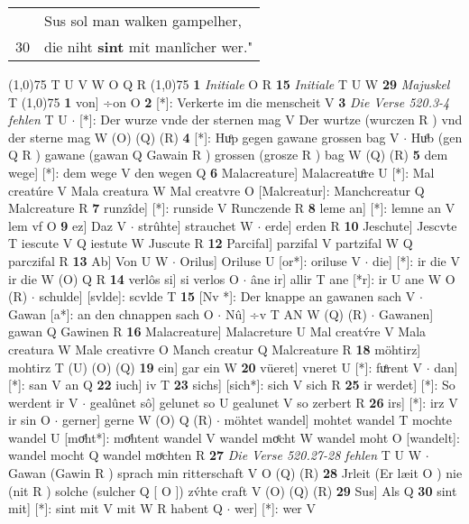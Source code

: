 \documentclass[8pt,a4paper,notitlepage]{article}
\begin{document}
\begin{table}[ht]
\begin{minipage}[t]{0.5\linewidth}
\begin{tabular}{rl}
 & Sus sol man walken gampelher,\\ 
30 & die niht \textbf{sint} mit manlîcher wer."\\ 
\end{tabular}
\scriptsize
\line(1,0){75} \newline
T U V W O Q R \newline
\line(1,0){75} \newline
\textbf{1} \textit{Initiale} O R  \textbf{15} \textit{Initiale} T U W  \textbf{29} \textit{Majuskel} T  \newline
\line(1,0){75} \newline
\textbf{1} von] ÷on O \textbf{2} [*]: Verkerte im die menscheit V \textbf{3} \textit{Die Verse 520.3-4 fehlen} T U   $\cdot$ [*]: Der wurze vnde der sternen mag V Der wurtze (wurczen R ) vnd der sterne mag W (O) (Q) (R) \textbf{4} [*]: Huͦp gegen gawane grossen bag V  $\cdot$ Huͦb (gen Q R ) gawane (gawan Q Gawain R ) grossen (grosze R ) bag W (Q) (R) \textbf{5} dem wege] [*]: dem wege V den wegen Q \textbf{6} Malacreature] Malacreatuͦre U [*]: Mal creatúre V Mala creatura W Mal creatvre O [Malcreatur]: Manchcreatur Q Malcreature R \textbf{7} runzîde] [*]: runside V Runczende R \textbf{8} leme an] [*]: lemne an V lem vf O \textbf{9} ez] Daz V  $\cdot$ strûhte] strauchet W  $\cdot$ erde] erden R \textbf{10} Jeschute] Jescvte T iescute V Q iestute W Juscute R \textbf{12} Parcifal] parzifal V partzifal W Q parczifal R \textbf{13} Ab] Von U W  $\cdot$ Orilus] Oriluse U [or*]: oriluse V  $\cdot$ die] [*]: ir die V ir die W (O) Q R \textbf{14} verlôs si] si verlos O  $\cdot$ âne ir] allir T ane [*r]: ir U ane W O (R)  $\cdot$ schulde] [svlde]: scvlde T \textbf{15} [Nv *]: Der knappe an gawanen sach V  $\cdot$ Gawan [a*]: an den chnappen sach O  $\cdot$ Nû] ÷v T AN W (Q) (R)  $\cdot$ Gawanen] gawan Q Gawinen R \textbf{16} Malacreature] Malacreture U Mal creatv́re V Mala creatura W Male creativre O Manch creatur Q Malcreature R \textbf{18} möhtirz] mohtirz T (U) (O) (Q) \textbf{19} ein] gar ein W \textbf{20} vüeret] vneret U [*]: fuͤrent V  $\cdot$ dan] [*]: san V an Q \textbf{22} iuch] iv T \textbf{23} sichs] [sich*]: sich V sich R \textbf{25} ir werdet] [*]: So werdent ir V  $\cdot$ gealûnet sô] gelunet so U gealunet V so zerbert R \textbf{26} irs] [*]: irz V ir sin O  $\cdot$ gerner] gerne W (O) Q (R)  $\cdot$ möhtet wandel] mohtet wandel T mochte wandel U [moͤht*]: moͤhtent wandel V wandel moͤcht W wandel moht O [wandelt]: wandel mocht Q wandel moͯchten R \textbf{27} \textit{Die Verse 520.27-28 fehlen} T U W   $\cdot$ Gawan (Gawin R ) sprach min ritterschaft V O (Q) (R) \textbf{28} Jrleit (Er læit O ) nie (nit R ) solche (sulcher Q [ O ]) zv́hte craft V (O) (Q) (R) \textbf{29} Sus] Als Q \textbf{30} sint mit] [*]: sint mit V mit W R habent Q  $\cdot$ wer] [*]: wer V \newline
\end{minipage}
\end{table}
\end{document}
